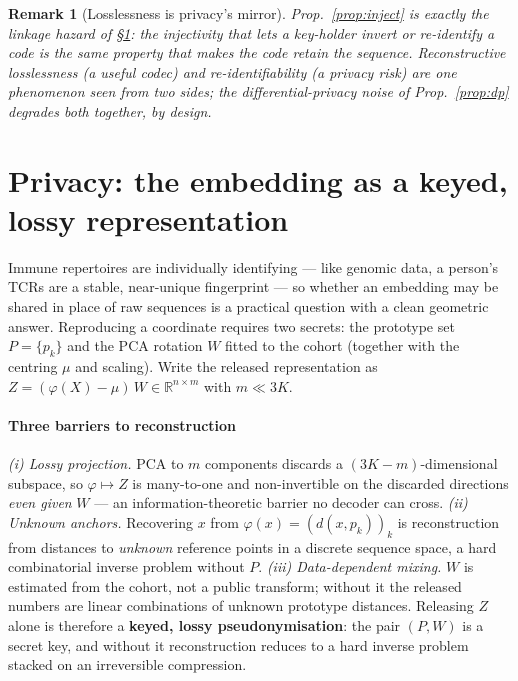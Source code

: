 \documentclass[11pt]{article}
\theoremstyle{oldplain}
\theoremstyle{oldrem}
\newtheorem{remark}{Remark}
\newcommand{\R}{\mathds{R}}  %
\begin{document}
\begin{remark}[Losslessness is privacy's mirror]\label{rem:loss-privacy}
Prop.~\ref{prop:inject} is exactly the linkage hazard of \S\ref{sec:privacy}: the injectivity that
lets a key-holder invert or re-identify a code is the same property that makes the code retain the
sequence. Reconstructive losslessness (a useful codec) and re-identifiability (a privacy risk) are
one phenomenon seen from two sides; the differential-privacy noise of Prop.~\ref{prop:dp} degrades
both together, by design.
\end{remark}

\section{Privacy: the embedding as a keyed, lossy representation}\label{sec:privacy}

Immune repertoires are individually identifying --- like genomic data, a person's {\scshape TCR}s are a
stable, near-unique fingerprint --- so whether an embedding may be shared in place of raw sequences is a
practical question with a clean geometric answer. Reproducing a coordinate requires two secrets: the
prototype set $P=\{p_k\}$ and the {\scshape PCA} rotation $W$ fitted to the cohort (together with the
centring $\mu$ and scaling). Write the released representation as $Z=(\varphi(X)-\mu)\,W\in\R^{n\times m}$
with $m\ll 3K$.

\paragraph{Three barriers to reconstruction} \emph{(i) Lossy projection.} {\scshape PCA} to $m$ components
discards a $(3K-m)$-dimensional subspace, so $\varphi\mapsto Z$ is many-to-one and non-invertible on the
discarded directions \emph{even given} $W$ --- an information-theoretic barrier no decoder can cross.
\emph{(ii) Unknown anchors.} Recovering $x$ from $\varphi(x)=(d(x,p_k))_k$ is reconstruction from distances
to \emph{unknown} reference points in a discrete sequence space, a hard combinatorial inverse problem
without $P$. \emph{(iii) Data-dependent mixing.} $W$ is estimated from the cohort, not a public transform;
without it the released numbers are linear combinations of unknown prototype distances. Releasing $Z$ alone
is therefore a \textbf{keyed, lossy pseudonymisation}: the pair $(P,W)$ is a secret key, and without it
reconstruction reduces to a hard inverse problem stacked on an irreversible compression.
\end{document}
